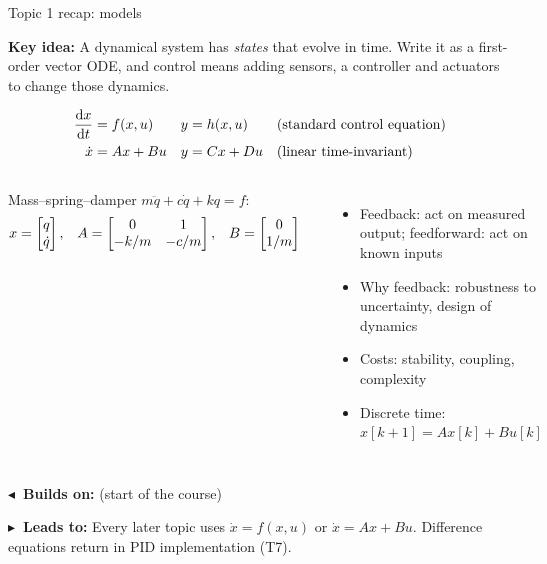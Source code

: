 \documentclass[10pt]{beamer-control}
\newcommand\LINKS[2]{%
  \par\vfill
  {\scriptsize\setlength\fboxsep{3pt}%
  \colorbox{AUHighlight!10}{\parbox{\dimexpr\linewidth-6pt\relax}{%
    \textbf{\color{AUHighlight}$\blacktriangleleft$~Builds on:} #1\par
    \textbf{\color{AUHighlight}$\blacktriangleright$~Leads to:} #2%
    \hfill\hyperlink{coursemap}{\beamerbutton{Course map}}}}}%
}
\newcommand\KEYIDEA[1]{%
  {\setlength\fboxsep{4pt}%
  \colorbox{NorthTce!12}{\parbox{\dimexpr\linewidth-8pt\relax}{\small\textbf{Key idea:} #1}}}\par\smallskip
}
\begin{document}
\begin{frame}[label=topic1]{Topic 1 recap: models}
  \KEYIDEA{A dynamical system has \emph{states} that evolve in time. Write it as a first-order vector ODE, and control means adding sensors, a controller and actuators to change those dynamics.}
  \begin{align*}
    \frac{\mathrm{d} x}{\mathrm{d} t} &= f(x,u) & y &= h(x,u) & &\text{(standard control equation)}\\
    \dot x &= Ax + Bu & y &= Cx + Du & &\text{(linear time-invariant)}
  \end{align*}
  \begin{columns}[t]
    \footnotesize
    Mass--spring--damper $m\ddot q + c\dot q + kq = f$:
    \begin{align*}
      x &= \begin{bmatrix}q\\\dot q\end{bmatrix}, &
      A &= \begin{bmatrix}0 & 1\\ -k/m & -c/m\end{bmatrix}, &
      B &= \begin{bmatrix}0\\1/m\end{bmatrix}
    \end{align*}
    \footnotesize
    \begin{itemize}
      \item Feedback: act on measured output; feedforward: act on known inputs
      \item Why feedback: robustness to uncertainty, design of dynamics
      \item Costs: stability, coupling, complexity
      \item Discrete time: $x[k{+}1] = Ax[k] + Bu[k]$
    \end{itemize}
  \end{columns}
  \LINKS{(start of the course)}{Every later topic uses $\dot x = f(x,u)$ or $\dot x = Ax+Bu$. Difference equations return in PID implementation (T7).}
\end{frame}
\end{document}
